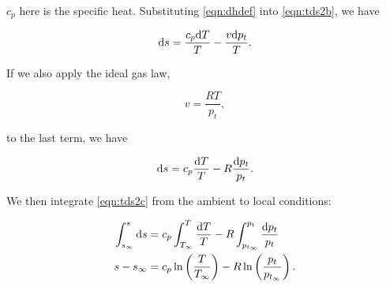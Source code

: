 \where \(c_p\) here is the specific heat.
%
Substituting \cref{eqn:dhdef} into \cref{eqn:tds2b}, we have

\begin{equation}
   \mathrm{d} s = \frac{c_p \mathrm{d} T}{T} - \frac{v \mathrm{d} p_t}{T}.
\end{equation}

\noindent If we also apply the ideal gas law,


\begin{equation}
        v = \frac{RT}{p_t},
\end{equation}

\noindent to the last term, we have


\begin{equation}
    \label{eqn:tds2c}
        \mathrm{d} s = c_p\frac{\mathrm{d} T}{T} - R\frac{\mathrm{d} p_t}{p_t}.
\end{equation}

\noindent We then integrate \cref{eqn:tds2c} from the ambient to local conditions:

\begin{equation}
    \begin{aligned}
        \int_{s_\infty}^s \mathrm{d} s &= c_p \int_{T_\infty}^T \frac{\mathrm{d} T}{T} - R \int_{p_{t_\infty}}^{p_t} \frac{\mathrm{d} p_t}{p_t} \\
        s-s_\infty &= c_p \ln\left(\frac{T}{T_\infty}\right) - R \ln\left(\frac{p_t}{p_{t_\infty}}\right).
    \end{aligned}
\end{equation}

